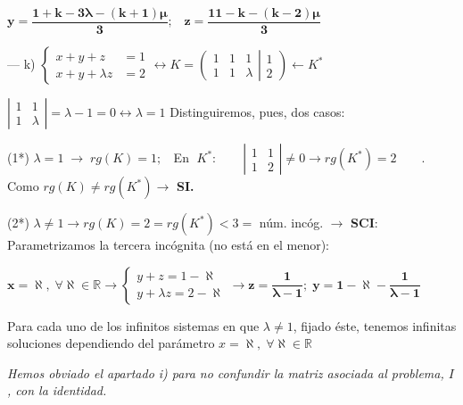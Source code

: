 \begin{proofw}
\noindent $\boldsymbol{y= \dfrac{1+k-3\lambda -(k+1)\mu}{3}; \;\; \;  z=\dfrac{11-k-(k-2)\mu}{3}}$


\noindent --- k) $\begin{cases}  x+y+z&=1\\x+y+\lambda z&=2   \end{cases} \leftrightarrow K=\left( \begin{matrix}    1&1&1\\1&1&\lambda    \end{matrix} \right|  \left.    \begin{matrix}  1\\2  \end{matrix} \right) \leftarrow K^*  $

\noindent $\left| \begin{matrix} 1&1\\1& \lambda \end{matrix} \right|=\lambda-1=0 \leftrightarrow \lambda=1$ Distinguiremos, pues, dos casos:

\noindent (1*) $\lambda=1 \; \to \;  rg(K)=1; \;  \;  $ En $\;  K^*: \qquad \left| \begin{matrix} 1&1\\1& 2\end{matrix} \right|\neq 0 \to rg(K^*)=2 \qquad$. Como $rg(K)\neq rg(K^*) \to $ \textbf{ SI.}

\noindent (2*) $\lambda \neq 1 \to rg(K)=2=rg(K^*)<3=$ núm. incóg. $\to$ \textbf{SCI}: Parametrizamos la tercera incógnita (no está en el menor):

\noindent $\boldsymbol{ x=\aleph} , \; \forall \aleph \in \mathbb R \to \begin{cases}  y+z=1-\aleph \\y+\lambda z= 2-\aleph \end{cases} \to \boldsymbol{z=\dfrac{1}{\lambda -1}; \; y=1-\aleph -\dfrac{1}{\lambda-1}}$

\noindent Para cada uno de los infinitos sistemas en que $\lambda \neq 1$, fijado éste, tenemos infinitas soluciones dependiendo del parámetro  $x=\aleph , \; \forall \aleph \in \mathbb R$

\vspace{3mm}
\textcolor{gris}{\emph{Hemos obviado el apartado i) para no confundir la matriz asociada al problema, $I$,  con la identidad.}}









\end{proofw}





